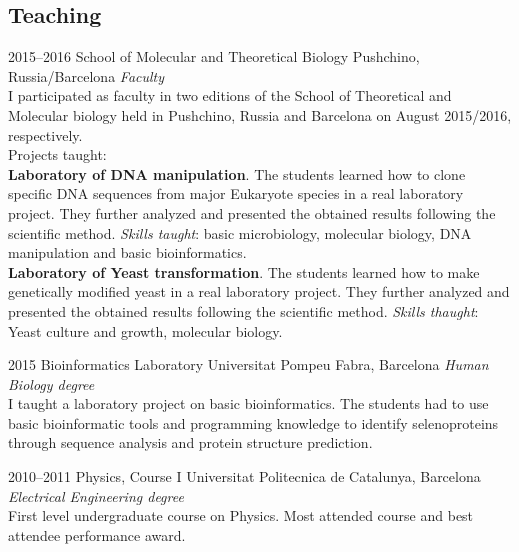 \documentclass[]{friggeri-cv} %
\begin{document}
\subsection{Teaching}

\begin{entrylist}

\entry
{2015--2016}
{School of Molecular and Theoretical Biology}
{Pushchino, Russia/Barcelona}
{\emph{Faculty}\\
I participated as faculty in two editions of the School of Theoretical
and Molecular biology held in Pushchino, Russia and Barcelona on
August 2015/2016, respectively.\\
Projects taught:\\
{\bf Laboratory of DNA manipulation}. The students learned how to clone specific DNA
sequences from major Eukaryote species in a real laboratory
project. They further analyzed and presented the obtained results
following the scientific method. {\em Skills taught}: basic microbiology,
molecular biology, DNA manipulation and basic bioinformatics. \\
{\bf Laboratory of Yeast transformation}. The students learned how to make genetically
modified yeast in a real laboratory project. They further analyzed and
presented the obtained results following the scientific method. {\em Skills
thaught}: Yeast culture and growth, molecular biology.
}


\entry
{2015}
{Bioinformatics Laboratory}
{Universitat Pompeu Fabra, Barcelona}
{\emph{Human Biology degree} \\
I taught a laboratory project on basic bioinformatics. The students
had to use basic bioinformatic tools and programming knowledge to
identify selenoproteins through sequence analysis and protein
structure prediction.} 


\end{entrylist}
\begin{entrylist}

\entry
{2010--2011}
{Physics, Course I}
{Universitat Politecnica de Catalunya, Barcelona}
{\emph{Electrical Engineering degree} \\
First level undergraduate course on Physics. Most attended course and best attendee
performance award.
}


\end{entrylist}
\end{document}
